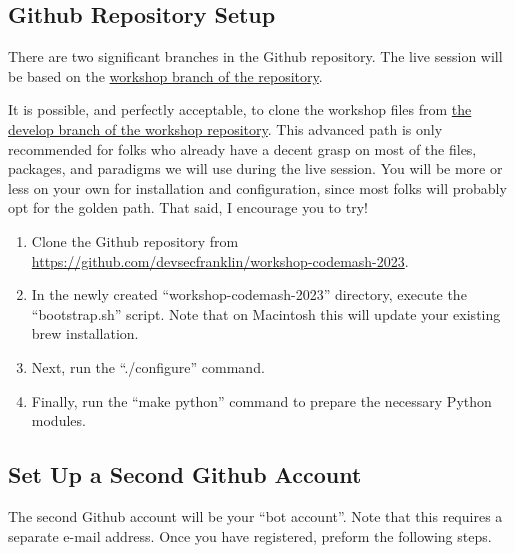 \subsection{\label{sec:repo}Github Repository Setup}

\justifying
There are two significant branches in the Github repository. The live session will be based on the \href{https://github.com/devsecfranklin/workshop-codemash-2023/tree/workshop}{workshop branch of the repository}.
\vspace{2mm}

\justifying
It is possible, and perfectly acceptable, to clone the workshop files from \href{https://github.com/devsecfranklin/workshop-codemash-2023/tree/develop}{the develop branch of the workshop repository}. This 
advanced path is only recommended for folks who already have a  decent grasp on most of the files, packages, and paradigms we will
use during the live session. You will be more or less on your own for installation and configuration, since most folks will probably
opt for the golden path. That said, I encourage you to try!
\vspace{2mm}

\begin{raggedright}
	\begin{enumerate}
		\item Clone the Github repository from \href{https://github.com/devsecfranklin/workshop-codemash-2023}{https://github.com/devsecfranklin/workshop-codemash-2023}.
		\item In the newly created ``workshop-codemash-2023'' directory, execute the ``bootstrap.sh'' script. Note that on Macintosh this will update your existing brew installation.
		\item Next, run the ``./configure'' command.
		\item Finally, run the ``make python'' command to prepare the necessary Python modules.
	\end{enumerate}
\end{raggedright}
\vspace{2mm}

\subsection{\label{sec:acct}Set Up a Second Github Account}

\justifying
The second Github account will be your ``bot account''. Note that this requires a separate e-mail address. Once you have registered,
preform the following steps.
\vspace{2mm}

